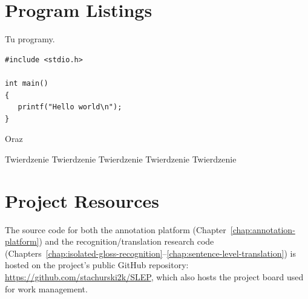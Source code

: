 
\section{Program Listings}
\label{app:programs}

Tu programy.

\begin{verbatim}
#include <stdio.h>

int main()
{
   printf("Hello world\n");
}
\end{verbatim}

\noindent
Oraz

\bigskip

\vrule\hspace{10pt}\begin{minipage}{10cm}
\end{minipage}

\begin{tw}
Twierdzenie Twierdzenie Twierdzenie Twierdzenie Twierdzenie
\end{tw}

\section{Project Resources}
\label{app:project-resources}

The source code for both the annotation platform
(Chapter~\ref{chap:annotation-platform}) and the recognition/translation
research code (Chapters~\ref{chap:isolated-gloss-recognition}--\ref{chap:sentence-level-translation})
is hosted on the project's public GitHub repository:
\url{https://github.com/stachurski2k/SLEP}, which also hosts the project board
used for work management.
